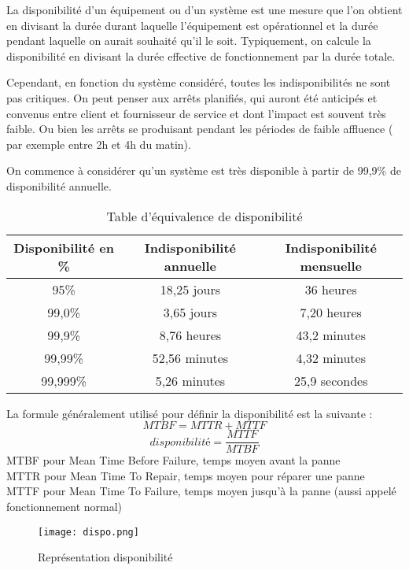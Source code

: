 \documentclass[a4paper,10pt,one side,titlepage]{report}
\begin{document}
La disponibilité d'un équipement ou d'un système est une mesure que l'on obtient
en divisant la durée durant laquelle l'équipement est opérationnel et la durée
pendant laquelle on aurait souhaité qu'il le soit.
Typiquement, on calcule la disponibilité en divisant la durée effective de fonctionnement
par la durée totale.

Cependant, en fonction du système considéré, toutes les indisponibilités ne sont pas
critiques. On peut penser aux arrêts planifiés, qui auront été anticipés et convenus 
entre client et fournisseur de service et dont l'impact est souvent très faible.
Ou bien les arrêts se produisant pendant les périodes de faible affluence ( par exemple 
entre 2h et 4h du matin).

On commence à considérer qu'un système est très disponible à partir de 99,9\% de disponibilité annuelle.
\begin{table}[H]
    \centering
    \begin{tabular}{|c|c|c|}
        \hline
        Disponibilité en \%&    Indisponibilité annuelle& Indisponibilité mensuelle\\
        \hline
        95\%&       18,25 jours&    36 heures\\
        \hline
        99,0\%& 3,65 jours& 7,20 heures\\
        \hline
        99,9\%& 8,76 heures&    43,2 minutes\\
        \hline
        99,99\%& 52,56 minutes& 4,32 minutes\\
        \hline
        99,999\%& 5,26 minutes& 25,9 secondes\\
        \hline
    \end{tabular}
    \caption{Table d'équivalence de disponibilité}
    
    \label{tab:disponibilite}
\end{table}
\newpage
La formule généralement utilisé pour définir la disponibilité est la suivante :
\[
MTBF=MTTR+MTTF
\]
\[
disponibilité = \frac{MTTF}{MTBF}
\]
MTBF pour Mean Time Before Failure, temps moyen avant la panne\\
MTTR pour Mean Time To Repair, temps moyen pour réparer une panne\\
MTTF pour Mean Time To Failure, temps moyen jusqu'à la panne (aussi appelé 
fonctionnement normal)


\begin{figure}[h]
    \centering
\texttt{[image: dispo.png]}
    \caption{Représentation disponibilité}
    \label{fig:repdispo}
\end{figure}
\end{document}
